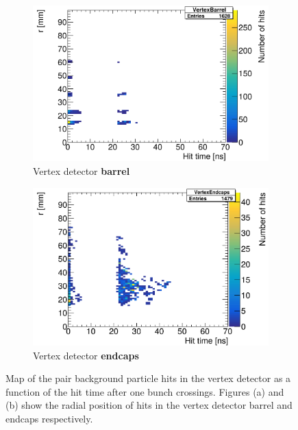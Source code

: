   \begin{figure}[h]
 \centering
  \begin{subfigure}[b]{0.49\textwidth}
   \centering
    \includegraphics[width=\textwidth]{Figures/Pairs/hittime_SiVertexBarrel.png}
   \caption{Vertex detector \textbf{barrel}}
   \end{subfigure}
   \hfill
    \begin{subfigure}[b]{0.49\textwidth}
   \centering
    \includegraphics[width=\textwidth]{Figures/Pairs/hittime_SiVertexEndcap.png}
   \caption{Vertex detector \textbf{endcaps}}
   \end{subfigure}
   \caption[Pair background hit time maps in the \sid vertex detector]{Map of the pair background particle hits in the \sid vertex detector as a function of the hit time after one bunch crossings.
   Figures (a) and (b) show the radial position of hits in the vertex detector barrel and endcaps respectively.
   }
   \label{fig:PairBkg:Hittime}
 \end{figure}
 
